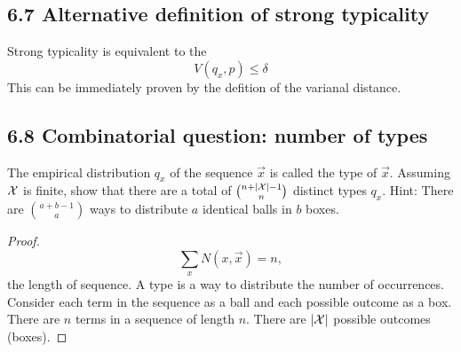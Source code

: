 \documentclass[../main.tex]{subfiles}
\begin{document}
\subsection*{6.7 Alternative definition of strong typicality}
Strong typicality is equivalent to the \[
V(q_x,p)\leq \delta
\]
This can be immediately proven by the defition of the varianal distance. 

\subsection*{6.8 Combinatorial question: number of types}
The empirical distribution $q_x$ of the sequence $\vec x$ is called the type of $\vec x$. Assuming $\mathcal{X}$ is finite, show that there are a total of $\binom{n+|\mathcal{X}|-1}{n}$ distinct types $q_x$. Hint: There are $\binom{a+b-1}{a}$ ways to distribute $a$ identical balls in $b$ boxes.
\begin{proof}
    \[
    \sum_x N(x,\vec x)=n,
    \] the length of sequence. A type is a way to distribute the number of occurrences. Consider each term in the sequence as a ball and each possible outcome as a box. There are $n$ terms in a sequence of length $n$. There are $|\mathcal{X}|$ possible outcomes (boxes).
\end{proof}
\end{document}
